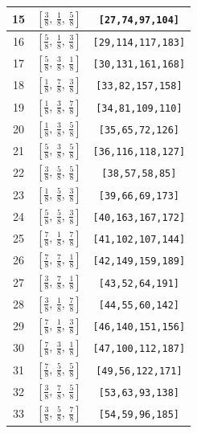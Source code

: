 \documentclass[fleqn,8pt]{jsarticle}
\begin{document}
\begin{longtable}{ccc}
15 & $\left[ \frac{3}{8},\, \frac{1}{8},\, \frac{5}{8} \right]$ & {\tt [27,74,97,104]} \\ \hline
16 & $\left[ \frac{5}{8},\, \frac{1}{8},\, \frac{3}{8} \right]$ & {\tt [29,114,117,183]} \\ \hline
17 & $\left[ \frac{5}{8},\, \frac{3}{8},\, \frac{1}{8} \right]$ & {\tt [30,131,161,168]} \\ \hline
18 & $\left[ \frac{1}{8},\, \frac{7}{8},\, \frac{3}{8} \right]$ & {\tt [33,82,157,158]} \\ \hline
19 & $\left[ \frac{1}{8},\, \frac{3}{8},\, \frac{7}{8} \right]$ & {\tt [34,81,109,110]} \\ \hline
20 & $\left[ \frac{1}{8},\, \frac{3}{8},\, \frac{5}{8} \right]$ & {\tt [35,65,72,126]} \\ \hline
21 & $\left[ \frac{5}{8},\, \frac{3}{8},\, \frac{5}{8} \right]$ & {\tt [36,116,118,127]} \\ \hline
22 & $\left[ \frac{3}{8},\, \frac{5}{8},\, \frac{5}{8} \right]$ & {\tt [38,57,58,85]} \\ \hline
23 & $\left[ \frac{1}{8},\, \frac{5}{8},\, \frac{3}{8} \right]$ & {\tt [39,66,69,173]} \\ \hline
24 & $\left[ \frac{5}{8},\, \frac{5}{8},\, \frac{3}{8} \right]$ & {\tt [40,163,167,172]} \\ \hline
25 & $\left[ \frac{7}{8},\, \frac{1}{8},\, \frac{7}{8} \right]$ & {\tt [41,102,107,144]} \\ \hline
26 & $\left[ \frac{7}{8},\, \frac{7}{8},\, \frac{1}{8} \right]$ & {\tt [42,149,159,189]} \\ \hline
27 & $\left[ \frac{3}{8},\, \frac{7}{8},\, \frac{1}{8} \right]$ & {\tt [43,52,64,191]} \\ \hline
28 & $\left[ \frac{3}{8},\, \frac{1}{8},\, \frac{7}{8} \right]$ & {\tt [44,55,60,142]} \\ \hline
29 & $\left[ \frac{7}{8},\, \frac{1}{8},\, \frac{3}{8} \right]$ & {\tt [46,140,151,156]} \\ \hline
30 & $\left[ \frac{7}{8},\, \frac{3}{8},\, \frac{1}{8} \right]$ & {\tt [47,100,112,187]} \\ \hline
31 & $\left[ \frac{7}{8},\, \frac{5}{8},\, \frac{5}{8} \right]$ & {\tt [49,56,122,171]} \\ \hline
32 & $\left[ \frac{3}{8},\, \frac{7}{8},\, \frac{5}{8} \right]$ & {\tt [53,63,93,138]} \\ \hline
33 & $\left[ \frac{3}{8},\, \frac{5}{8},\, \frac{7}{8} \right]$ & {\tt [54,59,96,185]} \\ \hline

\end{longtable}
\end{document}
